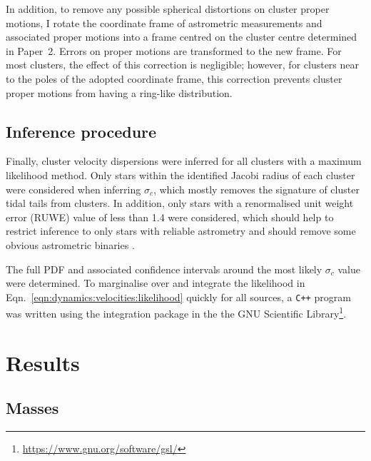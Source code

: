 In addition, to remove any possible spherical distortions on cluster proper motions, I rotate the coordinate frame of astrometric measurements and associated proper motions into a frame centred on the cluster centre determined in Paper~2. Errors on proper motions are transformed to the new frame. For most clusters, the effect of this correction is negligible; however, for clusters near to the poles of the adopted coordinate frame, this correction prevents cluster proper motions from having a ring-like distribution.

\subsection{Inference procedure}
\label{sec:dynamics:velocities:inference}

Finally, cluster velocity dispersions were inferred for all clusters with a maximum likelihood method. Only stars within the identified Jacobi radius of each cluster were considered when inferring $\sigma_c$, which mostly removes the signature of cluster tidal tails from clusters. In addition, only stars with a renormalised unit weight error (RUWE) value of less than 1.4 were considered, which should help to restrict inference to only stars with reliable astrometry and should remove some obvious astrometric binaries \citep{lindegren_gaia_2021,penoyre_astrometric_2022,penoyre_astrometric_2022-1}.

The full PDF and associated confidence intervals around the most likely $\sigma_c$ value were determined. To marginalise over and integrate the likelihood in Eqn.~\ref{eqn:dynamics:velocities:likelihood} quickly for all sources, a \texttt{C++} program was written using the integration package in the the GNU Scientific Library\footnote{\url{https://www.gnu.org/software/gsl/}}.


\section{Results}
\label{sec:dynamics:results}


\subsection{Masses}
\label{sec:dynamics:results:masses}

